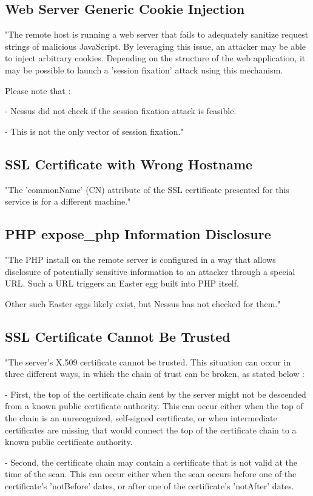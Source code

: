 \documentclass[
	12pt,				%
	openright,			%
	twoside,			%
	a4paper,			%
	english,			%
	french,				%
	spanish,			%
	brazil				%
	]{abntex2}
\begin{document}
\subsection{Web Server Generic Cookie Injection}
"The remote host is running a web server that fails to adequately
sanitize request strings of malicious JavaScript.  By leveraging this
issue, an attacker may be able to inject arbitrary cookies.  Depending
on the structure of the web application, it may be possible to launch
a 'session fixation' attack using this mechanism.

Please note that :

- Nessus did not check if the session fixation attack is
feasible.

- This is not the only vector of session fixation."

\subsection{SSL Certificate with Wrong Hostname}
"The 'commonName' (CN) attribute of the SSL certificate presented for
this service is for a different machine."

\subsection{PHP expose\_php Information Disclosure}
"The PHP install on the remote server is configured in a way that
allows disclosure of potentially sensitive information to an attacker
through a special URL.  Such a URL triggers an Easter egg built into
PHP itself. 

Other such Easter eggs likely exist, but Nessus has not checked for
them."

\subsection{SSL Certificate Cannot Be Trusted}
"The server's X.509 certificate cannot be trusted. This situation can
occur in three different ways, in which the chain of trust can be
broken, as stated below :

- First, the top of the certificate chain sent by the
server might not be descended from a known public
certificate authority. This can occur either when the
top of the chain is an unrecognized, self-signed
certificate, or when intermediate certificates are
missing that would connect the top of the certificate
chain to a known public certificate authority.

- Second, the certificate chain may contain a certificate
that is not valid at the time of the scan. This can
occur either when the scan occurs before one of the
certificate's 'notBefore' dates, or after one of the
certificate's 'notAfter' dates.
\end{document}
